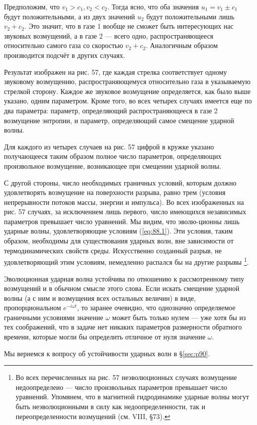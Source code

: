 Предположим, что $v_1 > c_1, v_2 < c_2$. Тогда ясно, что оба значения $u_1 =
v_1 \pm c_1$ будут положительными, а из двух значений $u_2$  будут
положительными лишь $v_2 + c_2$. Это значит, что в газе 1 вообще не сможет быть
интересующих нас звуковых возмущений, а в газе 2 — всего одно,
распространяющееся относительно самого газа со скоростью $v_2 + c_2$.
Аналогичным образом производится подсчёт в других случаях.

Результат изображен на рис. 57, где каждая стрелка соответствует одному
звуковому возмущению, распространяющемуся относительно газа в указываемую
стрелкой сторону. Каждое же звуковое возмущение определяется, как было выше
указано, одним параметром. Кроме того, во всех четырех случаях имеется еще по
два параметра: параметр, определяющий распространяющееся в газе 2 возмущение
энтропии, и параметр, определяющий самое смещение ударной волны.

Для каждого из четырех случаев на рис. 57 цифрой в кружке указано получающееся
таким образом полное число параметров, определяющих произвольное возмущение,
возникающее при смещении ударной волны.

С другой стороны, число необходимых граничных условий, которым должно
удовлетворять возмущение на поверхности разрыва, равно трем (условия
непрерывности потоков массы, энергии и импульса). Во всех изображенных на рис.
57 случаях, за исключением лишь первого, число имеющихся независимых параметров
превышает число уравнений. Мы видим, что эволю-ционны лишь ударные волны,
удовлетворяющие условиям (\ref{eq:88.1}). Эти условия, таким образом,
необходимы для существования ударных волн, вне зависимости от термодинамических
свойств среды. Искусственно созданный разрыв, не удовлетворяющий этим условиям,
немедленно распался бы на другие разрывы \footnote{Во всех перечисленных на
рис. 57 неэволюционных случаях возмущение недоопределеио — число произвольных
параметров превышает число уравнений. Упомянем, что в магнитной гидродинамике
ударные волны могут быть неэволюционными в силу как недоопределенности, так и
переопределенности возмущений (см. VIII, \S 73).}.

Эволюционная ударная волна устойчива по отношению к рассмотренному типу
возмущений и в обычном смысле этого слова. Если искать смещение ударной волны
(а с ним и возмущения всех остальных величин) в виде, пропорциональном $e^{-i
\omega t}$, то заранее очевидно, что однозначно определяемое граничными
условиями значение $\omega$ может быть только нулем — уже хотя бы из тех
соображений, что в задаче нет никаких параметров размерности обратного времени,
которые могли бы определить отличное от нуля значение $\omega$.

Мы вернемся к вопросу об устойчивости ударных волн в \S \ref{sec:p90}.

